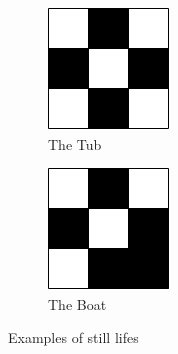 \documentclass{l4proj}
\begin{document}
\begin{figure}[h]
\begin{subfigure}[b]{0.25\textwidth}
    \includegraphics[width=\textwidth]{dissertation/images/gol_structures/still_life_2.png} 
    \caption{The Tub}
    \label{fig:subim1}
\end{subfigure}
\hfill
\begin{subfigure}[b]{0.25\textwidth}
    \includegraphics[width=\textwidth]{dissertation/images/gol_structures/still_life_3.png} 
    \caption{The Boat}
    \label{fig:subim1}
\end{subfigure}

\caption{Examples of still lifes}
\end{figure}
\end{document}
